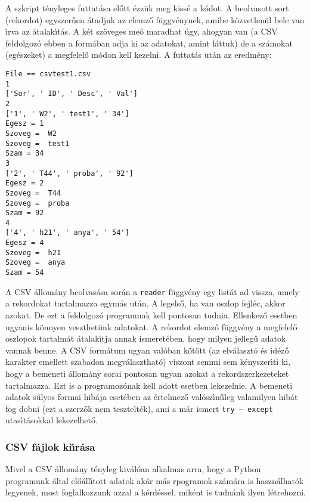 \noindent A szkript t\'enyleges futtat\'asa el\H{o}tt \'ezz\"uk meg kiss\'e a k\'odot. A beolvasott 
sort (rekordot) egyszer\H{u}en \'atadjuk az elemz\H{o} f\"uggv\'enynek, amibe k\"ozvetlen\"ul bele 
van \'{\i}rva az \'atalak\'{\i}t\'as. A k\'et sz\"oveges me\H{o} maradhat \'ugy, ahogyan van (a CSV 
feldolgoz\'o ebben a form\'aban adja ki az adatokat, amint l\'attuk) de a sz\'amokat (eg\'eszeket) 
a megfelel\H{o} m\'odon kell kezelni. A futtat\'as ut\'an az eredm\'eny:

\begin{Verbatim}[fontsize=\small]
File == csvtest1.csv
1
['Sor', ' ID', ' Desc', ' Val']
2
['1', ' W2', ' test1', ' 34']
Egesz = 1
Szoveg =  W2
Szoveg =  test1
Szam = 34
3
['2', ' T44', ' proba', ' 92']
Egesz = 2
Szoveg =  T44
Szoveg =  proba
Szam = 92
4
['4', ' h21', ' anya', ' 54']
Egesz = 4
Szoveg =  h21
Szoveg =  anya
Szam = 54
\end{Verbatim}

\noindent A CSV \'allom\'any beolvas\'asa sor\'an a {\tt reader} f\"uggv\'eny egy 
list\'at ad vissza, amely a rekordokat tartalmazza egym\'as ut\'an. A legels\H{o}, 
ha van oszlop fejl\'ec, akkor azokat. De ezt a feldolgoz\'o programnak 
kell pontosan tudnia. Ellenkez\H{o} esetben ugyanis k\"onnyen veszthet\"unk adatokat. 
A rekordot elemz\H{o} f\"uggv\'eny a megfelel\H{o} oszlopok tartalm\'at \'atalak\'{\i}tja 
annak ismeret\'eben, hogy milyen jelleg\H{u} adatok vannak benne. A CSV form\'atum ugyan 
val\'oban k\"ot\"ott (az elv\'alaszt\'o \'es id\'ez\H{o} karakter emellett szabadon 
megv\'alaszthat\'o) viszont semmi sem k\'enyszer\'{\i}ti ki, hogy a bemeneti \'allom\'any 
sorai pontosan ugyan azokat a rekordszerkezeteket tartalmazza. Ezt is a programoz\'onak 
kell adott esetben lekezelnie. A bemeneti adatok s\'ulyos formai hib\'aja eset\'eben az 
\'ertelmez\H{o} val\'osz\'{\i}n\H{u}leg valamilyen hib\'at fog dobni (ezt a szerz\H{o}k 
nem tesztelt\'ek), ami a m\'ar ismert {\tt try -- except} utas\'{\i}t\'asokkal lekezelhet\H{o}.

\subsubsection{CSV f\'ajlok ki\'{\i}r\'asa}

Mivel a CSV \'allom\'any t\'enyleg kiv\'al\'oan alkalmas arra, hogy a Python programunk 
\'altal el\H{o}\'all\'{\i}tott adatok ak\'ar m\'as rpogramok sz\'am\'ara is haszn\'alhat\'ok 
legyenek, most foglalkozzunk azzal a k\'erd\'essel, mik\'ent is tudn\'ank ilyen l\'etrehozni. 

